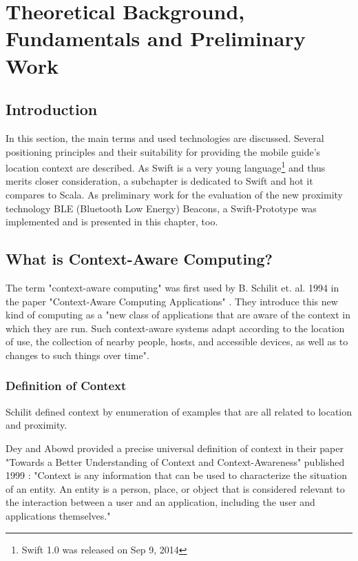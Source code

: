 \chapter{Theoretical Background, Fundamentals and Preliminary Work}


\section{Introduction}

In this section, the main terms and used technologies are discussed. Several positioning principles and their suitability for providing the mobile guide's location context are described. As Swift is a very young language\footnote{Swift 1.0 was released on Sep 9, 2014} and thus merits closer consideration, a subchapter is dedicated to Swift and hot it compares to Scala. As preliminary work for the evaluation of the new proximity technology BLE (Bluetooth Low Energy) Beacons, a Swift-Prototype was implemented and is presented in this chapter, too.

\section{What is Context-Aware Computing?}

The term "context-aware computing" was first used by B. Schilit et. al. 1994 in the paper "Context-Aware Computing Applications" \cite{Schilit94context-awarecomputing}. They introduce this new kind of computing as a "new class of applications that are aware of the context in which they are run. Such context-aware systems adapt according to the location of use, the collection of nearby people, hosts, and accessible devices, as well as to changes to such things over time".

\subsection{Definition of Context}

Schilit defined context by enumeration of examples that are all related to location and proximity.

Dey and Abowd provided a precise universal definition of context in their paper "Towards a Better Understanding of Context and Context-Awareness" published 1999 \cite{Abowd99}: "Context is any information that can be used to characterize the situation of an entity. An entity is a person, place, or object that is considered relevant to the interaction between a user and an application, including the user and applications themselves."

